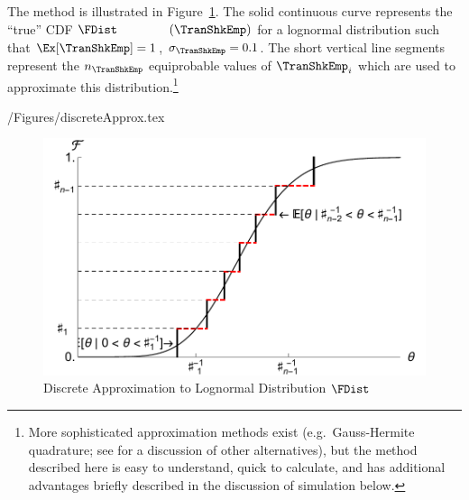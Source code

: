 \documentclass[titlepage, headings=optiontotocandhead]{\econtex}
\begin{document}
The method is illustrated in Figure~\ref{fig:discreteapprox}.  The solid continuous curve represents
the ``true'' CDF $\FDist_{\phantom{\TranShkEmp}}(\TranShkEmp)$ for a lognormal distribution such that $\Ex[\TranShkEmp] = 1$, $\sigma_{\TranShkEmp} = 0.1$.  The short vertical line segments represent the $n_{\TranShkEmp}$
equiprobable values of $\TranShkEmp_{i}$ which are used to approximate this
distribution.\footnote{More sophisticated approximation methods exist
  (e.g.\ Gauss-Hermite quadrature; see \cite{kopecky2010finite} for a discussion of other alternatives), but the method described here is easy to understand, quick to calculate, and has additional advantages briefly described in the
  discussion of simulation below.}
\begin{verbatimwrite}{\econtexRoot/Figures/discreteApprox.tex}
  \hypertarget{discreteApprox}{}
  \begin{figure}
    \includegraphics{./Figures/discreteApprox}
    \caption{Discrete Approximation to Lognormal Distribution $\FDist$}
    \label{fig:discreteapprox}
  \end{figure}
\end{verbatimwrite}
\unskip
\end{document}
